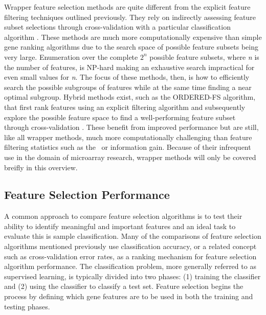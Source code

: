 {%

Wrapper feature selection methods are quite different from the explicit feature
filtering techniques outlined previously.  They rely on indirectly
assessing feature subset selections through cross-validation with a particular
classification algorithm \cite{Berrar_2003}.  These methods are much more
computationally expensive than simple gene ranking algorithms due to the search
space of possible feature subsets being very large. Enumeration over the
complete $2^n$ possible feature subsets, where \emph{n} is the number of
features, is NP-hard making an exhaustive search impractical for even small
values for \emph{n}. The focus of these methods, then, is how to efficiently search
the possible subgroups of features while at the same time finding a near
optimal subgroup.  Hybrid methods exist, such as the ORDERED-FS algorithm, that
first rank features using an explicit filtering algorithm and subsequently
explore the possible feature space to find a well-performing feature subset
through cross-validation \cite{Ng_1998}. These benefit from improved
performance but are still, like all wrapper methods, much more computationally
challenging than feature filtering statistics such as the \ttest\ or information
gain. Because of their infrequent use in the domain of microarray research,
wrapper methods will only be covered breifly in this overview.

\subsection{Feature Selection Performance}

A common approach to compare feature selection algorithms is to test their
ability to identify meaningful and important features and an ideal task to
evaluate this is sample classification.  Many of the comparisons of feature
selection algorithms mentioned previously use classification accuracy, or a
related concept such as cross-validation error rates, as a ranking mechanism
for feature selection algorithm performance.  The classification problem, more
generally referred to as supervised learning, is typically divided into two
phases: (1) training the classifier and (2) using the classifier to classify
a test set.  Feature selection begins the process by defining which gene
features are to be used in both the training and testing phases.

}
